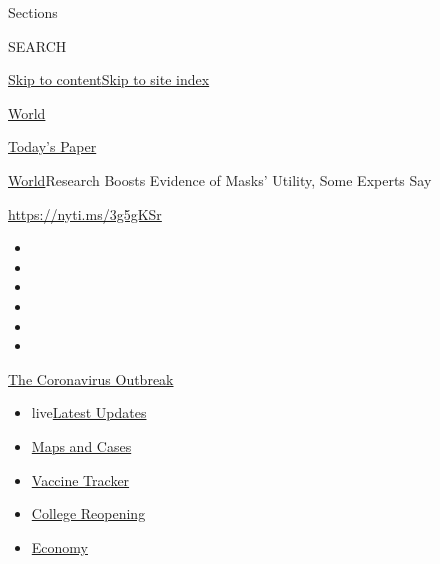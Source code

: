 Sections

SEARCH

\protect\hyperlink{site-content}{Skip to
content}\protect\hyperlink{site-index}{Skip to site index}

\href{https://www.nytimes3xbfgragh.onion/section/world}{World}

\href{https://myaccount.nytimes3xbfgragh.onion/auth/login?response_type=cookie\&client_id=vi}{}

\href{https://www.nytimes3xbfgragh.onion/section/todayspaper}{Today's
Paper}

\href{/section/world}{World}\textbar{}Research Boosts Evidence of Masks'
Utility, Some Experts Say

\url{https://nyti.ms/3g5gKSr}

\begin{itemize}
\item
\item
\item
\item
\item
\item
\end{itemize}

\href{https://www.nytimes3xbfgragh.onion/news-event/coronavirus?action=click\&pgtype=Article\&state=default\&region=TOP_BANNER\&context=storylines_menu}{The
Coronavirus Outbreak}

\begin{itemize}
\tightlist
\item
  live\href{https://www.nytimes3xbfgragh.onion/2020/08/04/world/coronavirus-covid-19.html?action=click\&pgtype=Article\&state=default\&region=TOP_BANNER\&context=storylines_menu}{Latest
  Updates}
\item
  \href{https://www.nytimes3xbfgragh.onion/interactive/2020/us/coronavirus-us-cases.html?action=click\&pgtype=Article\&state=default\&region=TOP_BANNER\&context=storylines_menu}{Maps
  and Cases}
\item
  \href{https://www.nytimes3xbfgragh.onion/interactive/2020/science/coronavirus-vaccine-tracker.html?action=click\&pgtype=Article\&state=default\&region=TOP_BANNER\&context=storylines_menu}{Vaccine
  Tracker}
\item
  \href{https://www.nytimes3xbfgragh.onion/2020/08/02/us/covid-college-reopening.html?action=click\&pgtype=Article\&state=default\&region=TOP_BANNER\&context=storylines_menu}{College
  Reopening}
\item
  \href{https://www.nytimes3xbfgragh.onion/live/2020/08/03/business/stock-market-today-coronavirus?action=click\&pgtype=Article\&state=default\&region=TOP_BANNER\&context=storylines_menu}{Economy}
\end{itemize}

